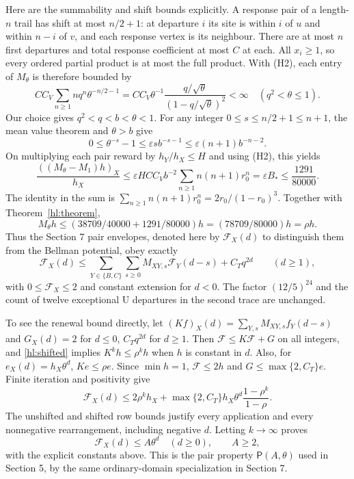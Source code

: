 Here are the summability and shift bounds explicitly.
A response pair of a length-$n$ trail has shift at most
$n/2+1$: at departure $i$ its site is within $i$ of $u$ and
within $n-i$ of $v$, and each response vertex is its neighbour.
There are at most $n$ first departures and total response
coefficient at most $C$ at each.  All $x_i\ge1$, so every
ordered partial product is at most the full product.  With
(H2), each entry of $M_\theta$ is therefore bounded by
\begin{equation}\label{hl:entries}
 CC_V\sum_{n\ge1}nq^n\theta^{-n/2-1}
 =CC_V\theta^{-1}\frac{q/\sqrt\theta}{(1-q/\sqrt\theta)^2}<\infty
       \quad(q^2<\theta\le1).
\end{equation}
Our choice gives $q^2<q<b<\theta<1$.  For any integer
$0\le s\le n/2+1\le n+1$, the mean value theorem and
$\theta>b$ give
\[
 0\le\theta^{-s}-1\le\varepsilon s b^{-s-1}
                       \le\varepsilon(n+1)b^{-n-2}.
\]
On multiplying each pair reward by $h_Y/h_X\le H$ and
using (H2), this yields
\begin{equation}\label{hl:shiftineq}
 \frac{((M_\theta-M_1)h)_X}{h_X}
 \le\varepsilon HCC_V b^{-2}\sum_{n\ge1}n(n+1)r_0^n
 =\varepsilon B_*\le\frac{1291}{80000}.
\end{equation}
The identity in the sum is
$\sum_{n\ge1}n(n+1)r_0^n=2r_0/(1-r_0)^3$.
Together with Theorem~\ref{hl:theorem},
\begin{equation}\label{hl:shifted}
 M_\theta h\le(38709/40000+1291/80000)h
                   =(78709/80000)h=\rho h.
\end{equation}
Thus the Section 7 pair envelopes, denoted here by
$\mathcal F_X(d)$ to distinguish them from the Bellman
potential, obey exactly
\begin{equation}\label{hl:recursion}
 \mathcal F_X(d)\le\sum_{Y\in\{B,C\}}\sum_{s\ge0}
     M_{XY,s}\mathcal F_Y(d-s)+C_Tq^{2d}\qquad(d\ge1),
\end{equation}
with $0\le\mathcal F_X\le2$ and constant extension for $d<0$.
The factor $(12/5)^{24}$ and the count of twelve exceptional
U departures in the second trace are unchanged.

To see the renewal bound directly, let
$(Kf)_X(d)=\sum_{Y,s}M_{XY,s}f_Y(d-s)$ and
$G_X(d)=2$ for $d\le0$, $C_Tq^{2d}$ for $d\ge1$.
Then $\mathcal F\le K\mathcal F+G$ on all integers, and
\eqref{hl:shifted} implies $K^kh\le\rho^kh$ when $h$ is
constant in $d$.  Also, for $e_X(d)=h_X\theta^d$,
$Ke\le\rho e$.  Since $\min h=1$,
$\mathcal F\le2h$ and $G\le\max\{2,C_T\}e$.
Finite iteration and positivity give
\[
 \mathcal F_X(d)\le2\rho^kh_X+
 \max\{2,C_T\}h_X\theta^d\frac{1-\rho^k}{1-\rho}.
\]
The unshifted and shifted row bounds justify every application
and every nonnegative rearrangement, including negative $d$.
Letting $k\to\infty$ proves
\begin{equation}\label{hl:decay}
 \mathcal F_X(d)\le A\theta^d\quad(d\ge0),\qquad A\ge2,
\end{equation}
with the explicit constants above.  This is the pair property
$\mathsf P(A,\theta)$ used in Section 5, by the same
ordinary-domain specialization in Section 7.

